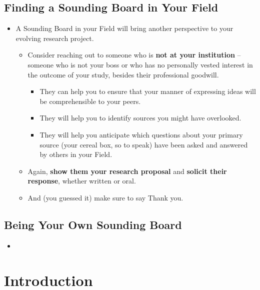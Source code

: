 \documentclass[11pt]{article}
\begin{document}
\subsection{Finding a Sounding Board in Your Field}
\begin{itemize}
\item \begin{exercise}
A Sounding Board in your Field will bring another perspective to your evolving research project. 
\begin{itemize}
\item Consider reaching out to someone who is \textbf{not at your institution} -- someone who is not your boss or who has no personally vested interest in the outcome of your study, besides their professional goodwill. 
\begin{itemize}
\item They can help you to ensure that your manner of expressing ideas will be comprehensible to your peers. 

\item They will help you to identify sources you might have overlooked. 

\item They will help you anticipate which questions about your primary source (your cereal box, so to speak) have been asked and answered by others
in your Field. 
\end{itemize}

\item Again, \textbf{show them your research proposal} and \textbf{solicit their response}, whether written or oral. 

\item And (you guessed it) make sure to say Thank you.
\end{itemize}
\end{exercise}
\end{itemize}
\subsection{Being Your Own Sounding Board}
\begin{itemize}
\item \begin{exercise}
\end{exercise}
\end{itemize}
\newpage
\section{Introduction}
\end{document}
